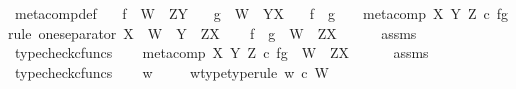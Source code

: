 \begin{isabellebody}
\isanewline
{}\isamarkupfalse%
%
\endisatagproof
{\isafoldproof}%
%
\isadelimproof
\isanewline
%
\endisadelimproof
\isanewline
{}\isamarkupfalse%
\ meta{\isacharunderscore}{\kern0pt}comp{}{\isacharunderscore}{\kern0pt}def{}{\isacharcolon}{\kern0pt}\isanewline
\ \ \ {\isachardoublequoteopen}f\ {\isacharcolon}{\kern0pt}\ W\ {\isasymrightarrow}\ Z\isactrlbsup Y\isactrlesup {\isachardoublequoteclose}\isanewline
\ \ \ {\isachardoublequoteopen}g\ {\isacharcolon}{\kern0pt}\ W\ {\isasymrightarrow}\ Y\isactrlbsup X\isactrlesup {\isachardoublequoteclose}\isanewline
\ \ \ {\isachardoublequoteopen}f\ {\isasymbox}\ g\ \ \ {\isacharequal}{\kern0pt}\ meta{\isacharunderscore}{\kern0pt}comp\ X\ Y\ Z\ {\isasymcirc}\isactrlsub c\ {\isasymlangle}f{\isacharcomma}{\kern0pt}g{\isasymrangle}{\isachardoublequoteclose}\isanewline
%
\isadelimproof
%
\endisadelimproof
%
\isatagproof
{}\isamarkupfalse%
{\isacharparenleft}{\kern0pt}rule\ one{\isacharunderscore}{\kern0pt}separator{\isacharbrackleft}{\kern0pt}\ X\ {\isacharequal}{\kern0pt}\ W{\isacharcomma}{\kern0pt}\ \ Y\ {\isacharequal}{\kern0pt}\ {\isachardoublequoteopen}Z\isactrlbsup X\isactrlesup {\isachardoublequoteclose}{\isacharbrackright}{\kern0pt}{\isacharparenright}{\kern0pt}\isanewline
\ \ \isamarkupfalse%
\ {\isachardoublequoteopen}f\ {\isasymbox}\ g\ {\isacharcolon}{\kern0pt}\ W\ {\isasymrightarrow}\ Z\isactrlbsup X\isactrlesup {\isachardoublequoteclose}\isanewline
\ \ \ \ \isamarkupfalse%
\ assms\ \isamarkupfalse%
\ typecheck{\isacharunderscore}{\kern0pt}cfuncs\isanewline
\ \ \isamarkupfalse%
\ {\isachardoublequoteopen}meta{\isacharunderscore}{\kern0pt}comp\ X\ Y\ Z\ {\isasymcirc}\isactrlsub c\ {\isasymlangle}f{\isacharcomma}{\kern0pt}g{\isasymrangle}\ {\isacharcolon}{\kern0pt}\ W\ {\isasymrightarrow}\ Z\isactrlbsup X\isactrlesup {\isachardoublequoteclose}\isanewline
\ \ \ \ \isamarkupfalse%
\ assms\ \isamarkupfalse%
\ typecheck{\isacharunderscore}{\kern0pt}cfuncs\isanewline
{}\isamarkupfalse%
\isanewline
\ \ \isamarkupfalse%
\ w\ \isanewline
\ \ \isamarkupfalse%
\ w{\isacharunderscore}{\kern0pt}type{\isacharbrackleft}{\kern0pt}type{\isacharunderscore}{\kern0pt}rule{\isacharbrackright}{\kern0pt}{\isacharcolon}{\kern0pt}\ {\isachardoublequoteopen}w\ {\isasymin}\isactrlsub c\ W{\isachardoublequoteclose}\isanewline

\end{isabellebody}
